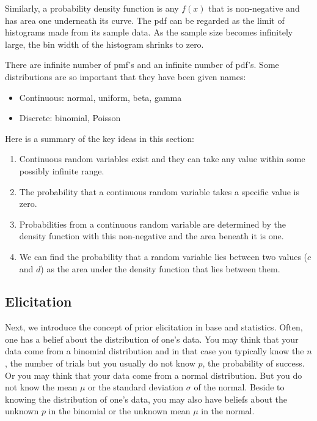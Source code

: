 \documentclass[]{book}
\theoremstyle{definition}
\theoremstyle{definition}
\theoremstyle{definition}
\theoremstyle{remark}
\begin{document}
Similarly, a probability density function is any \(f(x)\) that is
non-negative and has area one underneath its curve. The pdf can be
regarded as the limit of histograms made from its sample data. As the
sample size becomes infinitely large, the bin width of the histogram
shrinks to zero.

There are infinite number of pmf's and an infinite number of pdf's. Some
distributions are so important that they have been given names:

\begin{itemize}
\item
  Continuous: normal, uniform, beta, gamma
\item
  Discrete: binomial, Poisson
\end{itemize}

Here is a summary of the key ideas in this section:

\begin{enumerate}
\def\labelenumi{\arabic{enumi}.}
\item
  Continuous random variables exist and they can take any value within
  some possibly infinite range.
\item
  The probability that a continuous random variable takes a specific
  value is zero.
\item
  Probabilities from a continuous random variable are determined by the
  density function with this non-negative and the area beneath it is
  one.
\item
  We can find the probability that a random variable lies between two
  values (\(c\) and \(d\)) as the area under the density function that
  lies between them.
\end{enumerate}

\subsection{Elicitation}\label{elicitation}

Next, we introduce the concept of prior elicitation in base and
statistics. Often, one has a belief about the distribution of one's
data. You may think that your data come from a binomial distribution and
in that case you typically know the \(n\), the number of trials but you
usually do not know \(p\), the probability of success. Or you may think
that your data come from a normal distribution. But you do not know the
mean \(\mu\) or the standard deviation \(\sigma\) of the normal. Beside
to knowing the distribution of one's data, you may also have beliefs
about the unknown \(p\) in the binomial or the unknown mean \(\mu\) in
the normal.
\end{document}

